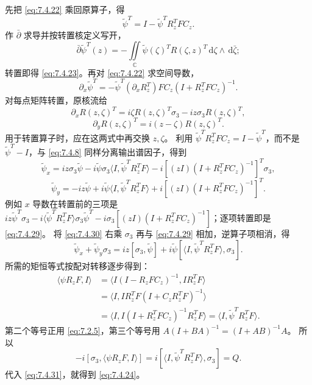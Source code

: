 \documentclass[lang=cn,scheme=chinese,mode=simple,device=normal,color=blue,math=cm,thmcnt=section,12pt]{elegantbook}
\newcommand{\dd}{\,\mathrm{d}}
\newcommand{\eqq}[2]{\tag{#1}\label{eq:#1}#2}
\begin{document}
\begin{callout}
先把 \eqref{eq:7.4.22} 乘回原算子，得
\begin{equation}
\eqq{7.4.25}{\widetilde\psi^T=I-\widetilde\psi^TR_z^TFC_z.}
\end{equation}
作 $\bar\partial$ 求导并按转置核定义写开，
\[
\bar\partial\widetilde\psi^T(z)=-\iint\limits_{\mathbb C}\widetilde\psi(\zeta)^TR(\zeta,z)^T\dd\zeta\wedge\dd\bar\zeta;
\]
转置即得 \eqref{eq:7.4.23}。再对 \eqref{eq:7.4.22} 求空间导数，
\begin{equation}
\eqq{7.4.26}{\partial_x\widetilde\psi^T=-\widetilde\psi^T(\partial_xR_z^T)FC_z(I+R_z^TFC_z)^{-1}.}
\end{equation}
对每点矩阵转置，原核流给
\begin{equation}
\eqq{7.4.27}{\partial_xR(z,\zeta)^T=i\zeta R(z,\zeta)^T\sigma_3-iz\sigma_3R(z,\zeta)^T,}
\end{equation}
\begin{equation}
\eqq{7.4.28}{\partial_yR(z,\zeta)^T=i(z-\zeta)R(z,\zeta)^T.}
\end{equation}
用于转置算子时，应在这两式中再交换 $z,\zeta$。
利用 $\widetilde\psi^TR_z^TFC_z=I-\widetilde\psi^T$，而不是 $\widetilde\psi^T-I$，与 \eqref{eq:7.4.8} 同样分离输出谱因子，得到
\begin{equation}
\eqq{7.4.29}{\widetilde\psi_x=iz\sigma_3\widetilde\psi-i\widetilde\psi\sigma_3\langle I,\widetilde\psi^TR_z^TF\rangle
-i[(zI)(I+R_z^TFC_z)^{-1}]^T\sigma_3,}
\end{equation}
\begin{equation}
\eqq{7.4.30}{\widetilde\psi_y=-iz\widetilde\psi+i\widetilde\psi\langle I,\widetilde\psi^TR_z^TF\rangle
+i[(zI)(I+R_z^TFC_z)^{-1}]^T.}
\end{equation}
例如 $x$ 导数在转置前的三项是
$iz\widetilde\psi^T\sigma_3-i\langle\widetilde\psi^TR_z^TF\rangle\sigma_3\widetilde\psi^T
-i\sigma_3[(zI)(I+R_z^TFC_z)^{-1}]$；逐项转置即是 \eqref{eq:7.4.29}。
将 \eqref{eq:7.4.30} 右乘 $\sigma_3$ 再与 \eqref{eq:7.4.29} 相加，逆算子项相消，得
\begin{equation}
\eqq{7.4.31}{\widetilde\psi_x+\widetilde\psi_y\sigma_3
=iz[\sigma_3,\widetilde\psi]+i\widetilde\psi[\langle I,\widetilde\psi^TR_z^TF\rangle,\sigma_3].}
\end{equation}
所需的矩恒等式按配对转移逐步得到：
\begin{equation}
\eqq{7.4.32}{\begin{aligned}
\langle\psi R_zF,I\rangle
&=\langle I(I-R_zFC_z)^{-1},IR_z^TF\rangle\\
&=\langle I,IR_z^TF(I+C_zR_z^TF)^{-1}\rangle\\
&=\langle I,I(I+R_z^TFC_z)^{-1}R_z^TF\rangle
=\langle I,\widetilde\psi^TR_z^TF\rangle.
\end{aligned}}
\end{equation}
第二个等号正用 \eqref{eq:7.2.5}，第三个等号用 $A(I+BA)^{-1}=(I+AB)^{-1}A$。
所以
\begin{equation}
\eqq{7.4.33}{-i[\sigma_3,\langle\psi R_zF,I\rangle]
=i[\langle I,\widetilde\psi^TR_z^TF\rangle,\sigma_3]=Q.}
\end{equation}
代入 \eqref{eq:7.4.31}，就得到 \eqref{eq:7.4.24}。
\end{callout}
\end{document}
